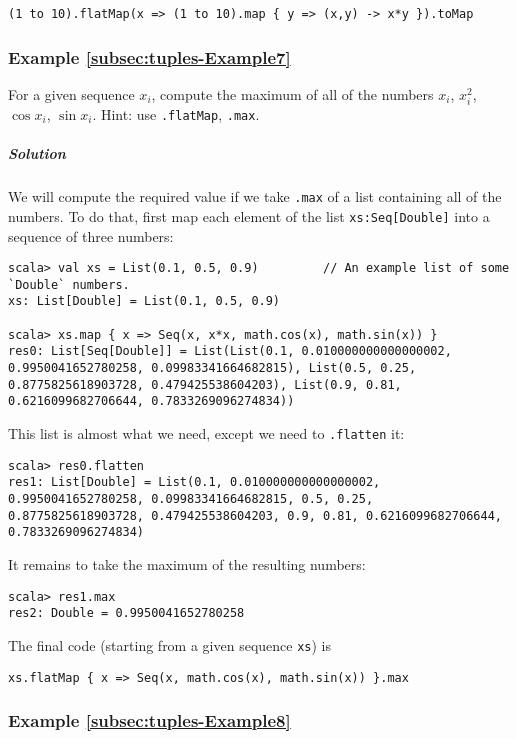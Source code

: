 \begin{lstlisting}
(1 to 10).flatMap(x => (1 to 10).map { y => (x,y) -> x*y }).toMap
\end{lstlisting}


\subsubsection{Example \label{subsec:tuples-Example7}\ref{subsec:tuples-Example7}}

For a given sequence $x_{i}$, compute the maximum of all of the numbers
$x_{i}$, $x_{i}^{2}$, $\cos x_{i}$, $\sin x_{i}$. Hint: use \lstinline!.flatMap!,
\lstinline!.max!.

\subparagraph{Solution}

We will compute the required value if we take \lstinline!.max! of
a list containing all of the numbers. To do that, first map each element
of the list \lstinline!xs:Seq[Double]! into a sequence of three numbers:
\begin{lstlisting}
scala> val xs = List(0.1, 0.5, 0.9)         // An example list of some `Double` numbers.
xs: List[Double] = List(0.1, 0.5, 0.9)

scala> xs.map { x => Seq(x, x*x, math.cos(x), math.sin(x)) }
res0: List[Seq[Double]] = List(List(0.1, 0.010000000000000002, 0.9950041652780258, 0.09983341664682815), List(0.5, 0.25, 0.8775825618903728, 0.479425538604203), List(0.9, 0.81, 0.6216099682706644, 0.7833269096274834))
\end{lstlisting}
This list is almost what we need, except we need to \lstinline!.flatten!
it:
\begin{lstlisting}
scala> res0.flatten
res1: List[Double] = List(0.1, 0.010000000000000002, 0.9950041652780258, 0.09983341664682815, 0.5, 0.25, 0.8775825618903728, 0.479425538604203, 0.9, 0.81, 0.6216099682706644, 0.7833269096274834) 
\end{lstlisting}
It remains to take the maximum of the resulting numbers:
\begin{lstlisting}
scala> res1.max
res2: Double = 0.9950041652780258
\end{lstlisting}
The final code (starting from a given sequence \lstinline!xs!) is

\begin{lstlisting}
xs.flatMap { x => Seq(x, math.cos(x), math.sin(x)) }.max
\end{lstlisting}


\subsubsection{Example \label{subsec:tuples-Example8}\ref{subsec:tuples-Example8}}

